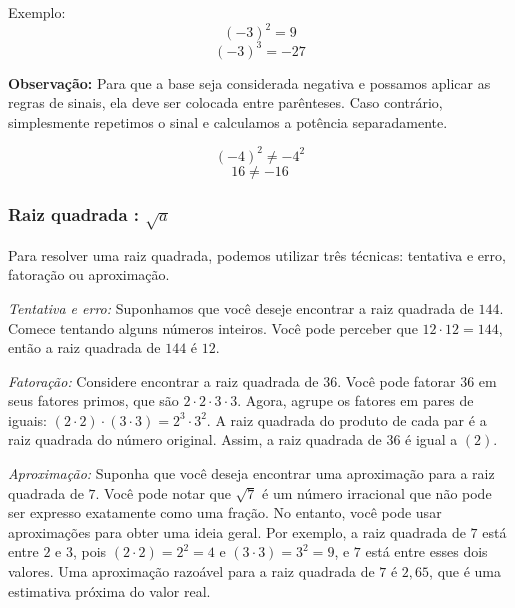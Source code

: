 {\medskip\noindent Exemplo: 
$$\left( - 3 \right)^{2} = 9$$ 
$$\left( - 3 \right)^{3} = -27$$

\medskip \noindent \textbf{Observação:} Para que a base seja considerada
 negativa e possamos aplicar as regras de sinais, ela deve ser colocada entre
 parênteses. Caso contrário, simplesmente repetimos o sinal e calculamos a
 potência separadamente.

$$\left( - 4 \right)^{2} \neq - 4^{2}$$
$$16 \neq - 16$$

\subsubsection*{Raiz quadrada : $\sqrt{a}$}

Para resolver uma raiz quadrada, podemos utilizar três técnicas:
tentativa e erro, fatoração ou aproximação.


\medskip\noindent \textit{Tentativa e erro:} Suponhamos que você deseje encontrar a raiz quadrada de
$144$. Comece tentando alguns números inteiros. Você pode perceber que
$12 \cdot 12 = 144$, então a raiz quadrada de $144$ é $12$.

\medskip\noindent \textit{Fatoração:} Considere encontrar a raiz quadrada de $36$. Você pode fatorar $36$
em seus fatores primos, que são $2 \cdot 2 \cdot 3 \cdot 3$. Agora, agrupe os
fatores em pares de iguais: $(2 \cdot 2) \cdot (3 \cdot 3) = 2^3 \cdot 3^2$. A raiz quadrada
do produto de cada par é a raiz quadrada do número original. Assim, a raiz
quadrada de $36$ é igual a $(2)$.

\medskip\noindent \textit{Aproximação:} Suponha que você deseja encontrar uma aproximação para a raiz
quadrada de $7$. Você pode notar que $\sqrt{7}$ é um número irracional que
não pode ser expresso exatamente como uma fração. No entanto, você pode usar
aproximações para obter uma ideia geral. Por exemplo,  a
raiz quadrada de $7$ está entre $2$ e $3$, pois $(2 \cdot 2) = 2^2 = 4$ e $(3 \cdot 3) = 3^2 = 9$, e $7$ está
entre esses dois valores. Uma aproximação razoável para a raiz quadrada de $7$
é $2,65$, que é uma estimativa próxima do valor real.}



